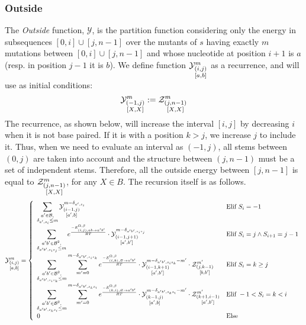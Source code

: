\subsubsection{Outside}	
The \emph{Outside} function, $\mathcal Y$, is the partition function considering only the 
energy in subsequences $[0,i]\cup[j,n-1]$ over the mutants of $s$ having exactly $m$ mutations between $[0,i]\cup[j,n-1]$ and whose nucleotide at position $i+1$ is $a$ 
(resp. in position $j-1$ it is $b$).
We define function $\Y{i,j}{m}{a,b}$ as a recurrence, and will use as initial conditions:
\begin{equation}
	\Y{-1,j}{m}{X,X}:=
		\displaystyle
	  \Z{j,n-1}{m}{X,X}
\label{eq:Y_in}
\end{equation}
The recurrence, as shown below, will increase the interval $[i,j]$ by decreasing $i$ when
it is not base paired. If it is with a position $k>j$, we increase $j$ to include it.
 Thus, when we need
to evaluate an interval as $(-1,j)$, all stems between $(0,j)$ are taken into account and the
structure between $(j,n-1)$ must be a set of independent stems. Therefore,
 all the outside energy between $[j,n-1]$ is
equal to $\Z{j,n-1}{m}{X,X}$, for any $X\in B$. The recursion itself is as follows.
\begin{equation}
	\Y{i,j}{m}{a,b} = \left\{
  \begin{array}{ll}
		\displaystyle
    \sum_{\substack{a'\in \B,\\ \Kron_{a',s_i}\le m}}
    \Y{i-1,j}{m- \Kron_{a',s_i}}{a',b} &
    \text{Elif }S_i=-1 \\
    \displaystyle
    \sum_{\substack{a'b'\in \B^2,\\ \Kron_{a'b',s_is_j}\le m}}
		 e^{\frac{-E_{(i,j),ab \to a'b'}^{\Omega,\beta}}{RT}}\cdot
    \Y{i-1,j+1}{m- \Kron_{a'b',s_is_j}}{a',b'} &
   	 \text{Elif }S_{i}=j \land S_{i+1}=j-1\\
		 \displaystyle
		 \sum_{\substack{a'b'\in \B^2,\\ \Kron_{a'b',s_is_k}\le m}}
		 \sum_{m'=0}^{m-\Kron_{a'b',s_is_k}}
  		 e^{\frac{-E_{(i,k),\varnothing\to a'b'}^{\Omega,\beta}}{RT}}
		 \cdot\Y{i-1,k+1}{m- \Kron_{a'b',s_is_k} - m'}{a',b'}
     \cdot\Z{j,k-1}{m'}{b,b'} &
		 \text{Elif }S_{i}=k \geq j\\
		 \displaystyle
		 \sum_{\substack{a'b'\in \B^2,\\ \Kron_{a'b',s_ks_i}\le m}}
		 \sum_{m'=0}^{m-\Kron_{a'b',s_ks_i}}
   	 e^{\frac{-E_{(k,i),\varnothing\to a'b'}^{\Omega,\beta}}{RT}}
		 \cdot\Y{k-1,j}{m- \Kron_{a'b',s_ks_i} - m'}{a',b}
     \cdot\Z{k+1,i-1}{m'}{a',b'} &
		 \text{Elif }-1 < S_{i}=k < i\\
		 0 & \text{Else}
  \end{array}\right.
\label{eq:Y_rec}
\end{equation}
